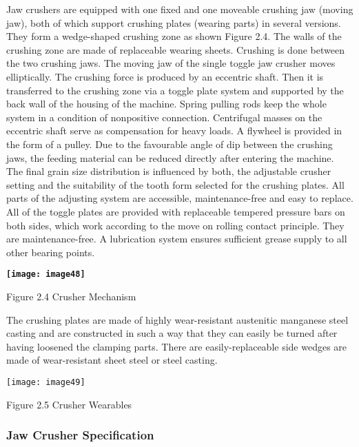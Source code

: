 \noindent Jaw crushers are equipped with one fixed and one moveable crushing jaw (moving jaw), both of which support crushing plates (wearing parts) in several versions. They form a wedge-shaped crushing zone as shown Figure 2.4. The walls of the crushing zone are made of replaceable wearing sheets. Crushing is done between the two crushing jaws. The moving jaw of the single toggle jaw crusher moves elliptically. The crushing force is produced by an eccentric shaft. Then it is transferred to the crushing zone via a toggle plate system and supported by the back wall of the housing of the machine. Spring pulling rods keep the whole system in a condition of nonpositive connection. Centrifugal masses on the eccentric shaft serve as compensation for heavy loads. A flywheel is provided in the form of a pulley. Due to the favourable angle of dip between the crushing jaws, the feeding material can be reduced directly after entering the machine. The final grain size distribution is influenced by both, the adjustable crusher setting and the suitability of the tooth form selected for the crushing plates. All parts of the adjusting system are accessible, maintenance-free and easy to replace. All of the toggle plates are provided with replaceable tempered pressure bars on both sides, which work according to the move on rolling contact principle. They are maintenance-free. A lubrication system ensures sufficient grease supply to all other bearing points. \par

\noindent \textbf{\texttt{[image: image48]}}

\noindent Figure 2.4 Crusher Mechanism

\noindent The crushing plates are made of highly wear-resistant austenitic manganese steel casting and are constructed in such a way that they can easily be turned after having loosened the clamping parts. There are easily-replaceable side wedges are made of wear-resistant sheet steel or steel casting.\par

\noindent \texttt{[image: image49]}\textbf{}

\noindent Figure 2.5 Crusher Wearables


\subsubsection{ Jaw Crusher Specification}

